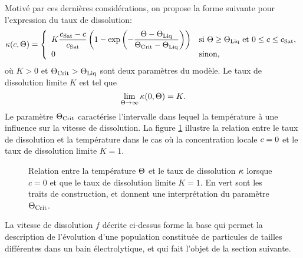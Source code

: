 Motivé par ces dernières considérations, on propose la forme suivante
pour l'expression du taux de dissolution:
\begin{equation}\label{eq:dissolution-rate}
  \kappa(c, \Theta) =
  \left\{
  \begin{array}{ll}
    K\displaystyle\frac{c_\text{Sat} - c}{c_\text{Sat}}\left( 1 -
      \exp\left( -\displaystyle\frac{\Theta - \Theta_\text{Liq}}{\Theta_\text{Crit} -
          \Theta_\text{Liq}} \right) \right) & \text{si }\Theta \geq \Theta_\text{Liq}\text{ et }
    0\leq c
    \leq c_\text{Sat},\\
    0                                     & \text{sinon,}
  \end{array}
  \right.
\end{equation}
où $K > 0$ et $\Theta_\text{Crit} > \Theta_\text{Liq}$ sont deux paramètres du modèle. Le taux
de dissolution limite $K$ est tel que
\begin{equation}
  \lim_{\Theta \to\infty}\kappa(0, \Theta) = K.
\end{equation}
Le paramètre $\Theta_\text{Crit}$ caractérise l'intervalle dans lequel la
température à une influence sur la vitesse de dissolution. La figure
\ref{fig:diss-rate} illustre la relation entre le taux de dissolution
et la température dans le cas où la concentration locale
$c = 0$ et le taux de dissolution limite $K = 1$.

\begin{figure}[h]
  \begin{center}
    
    \caption{Relation entre la température $\Theta$ et le taux de
      dissolution $\kappa$ lorsque $c = 0$ et que le taux
      de dissolution limite $K = 1$. En vert sont les traits de
      construction, et donnent une interprétation du paramètre
      $\Theta_\text{Crit}$.}
    \label{fig:diss-rate}
  \end{center}
\end{figure}

La vitesse de dissolution $f$ décrite ci-dessus forme la base qui
permet la description de l'évolution d'une population constituée de
particules de tailles différentes dans un bain électrolytique, et qui
fait l'objet de la section suivante.
